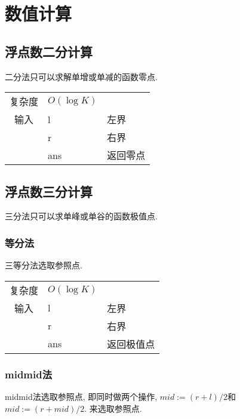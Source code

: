 \section{数值计算}


    \subsection{浮点数二分计算}\small
二分法只可以求解单增或单减的函数零点.

\begin{longtable}{|c|l|l|}
复杂度 & $O(\log K)$ &  \\
输入 & l & 左界 \\
 & r & 右界 \\
 & ans & 返回零点 \\ 
\end{longtable}



    \subsection{浮点数三分计算}\small
三分法只可以求单峰或单谷的函数极值点.



        \subsubsection{等分法}\small
三等分法选取参照点.

\begin{longtable}{|c|l|l|}
复杂度 & $O(\log K)$ &  \\
输入 & l & 左界 \\
 & r & 右界 \\
 & ans & 返回极值点 \\ 
\end{longtable}



        \subsubsection{midmid法}\small
midmid法选取参照点, 即同时做两个操作, $mid := (r + l) / 2$和$mid := (r + mid) / 2$.
来选取参照点.

